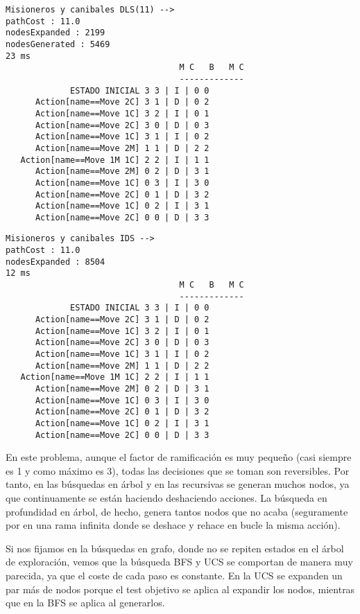 \documentclass{article}
\begin{document}
\begin{multicols}{2}

\begin{Verbatim}[fontsize=\footnotesize]
Misioneros y canibales DLS(11) -->
pathCost : 11.0
nodesExpanded : 2199
nodesGenerated : 5469
23 ms
                                   M C   B   M C
                                   -------------
             ESTADO INICIAL	3 3 | I | 0 0
      Action[name==Move 2C]	3 1 | D | 0 2
      Action[name==Move 1C]	3 2 | I | 0 1
      Action[name==Move 2C]	3 0 | D | 0 3
      Action[name==Move 1C]	3 1 | I | 0 2
      Action[name==Move 2M]	1 1 | D | 2 2
   Action[name==Move 1M 1C]	2 2 | I | 1 1
      Action[name==Move 2M]	0 2 | D | 3 1
      Action[name==Move 1C]	0 3 | I | 3 0
      Action[name==Move 2C]	0 1 | D | 3 2
      Action[name==Move 1C]	0 2 | I | 3 1
      Action[name==Move 2C]	0 0 | D | 3 3
\end{Verbatim}
              
\begin{Verbatim}[fontsize=\footnotesize]
Misioneros y canibales IDS -->
pathCost : 11.0
nodesExpanded : 8504
12 ms
                                   M C   B   M C
                                   -------------
             ESTADO INICIAL	3 3 | I | 0 0
      Action[name==Move 2C]	3 1 | D | 0 2
      Action[name==Move 1C]	3 2 | I | 0 1
      Action[name==Move 2C]	3 0 | D | 0 3
      Action[name==Move 1C]	3 1 | I | 0 2
      Action[name==Move 2M]	1 1 | D | 2 2   
   Action[name==Move 1M 1C]	2 2 | I | 1 1
      Action[name==Move 2M]	0 2 | D | 3 1
      Action[name==Move 1C]	0 3 | I | 3 0
      Action[name==Move 2C]	0 1 | D | 3 2
      Action[name==Move 1C]	0 2 | I | 3 1
      Action[name==Move 2C]	0 0 | D | 3 3
\end{Verbatim}

            
\end{multicols}

En este problema, aunque el factor de ramificación es muy pequeño (casi siempre es 1 y como máximo es 3), todas las decisiones que se toman son reversibles. Por tanto, en las búsquedas en árbol y en las recursivas se generan muchos nodos, ya que continuamente se están haciendo deshaciendo acciones. La búsqueda en profundidad en árbol, de hecho, genera tantos nodos que no acaba (seguramente por en una rama infinita donde se deshace y rehace en bucle la misma acción).

Si nos fijamos en la búsquedas en grafo, donde no se repiten estados en el árbol de exploración, vemos que la búsqueda BFS y UCS se comportan de manera muy parecida, ya que el coste de cada paso es constante. En la UCS se expanden un par más de nodos porque el test objetivo se aplica al expandir los nodos, mientras que en la BFS se aplica al generarlos.
\end{document}
